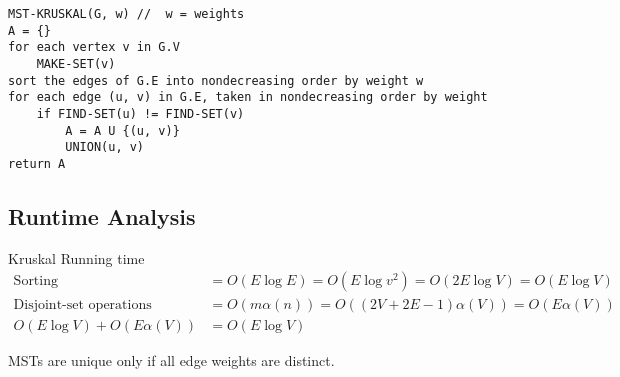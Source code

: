\documentclass{article}
\begin{document}
\begin{verbatim}
MST-KRUSKAL(G, w) //  w = weights
A = {}
for each vertex v in G.V
    MAKE-SET(v)
sort the edges of G.E into nondecreasing order by weight w
for each edge (u, v) in G.E, taken in nondecreasing order by weight
    if FIND-SET(u) != FIND-SET(v)
        A = A U {(u, v)}
        UNION(u, v)
return A
\end{verbatim}

\subsection*{Runtime Analysis}
Kruskal Running time
\begin{align*}
    \text{Sorting }                & = O(E \log E) = O(E \log v^2) = O(2E \log V) = O(E \log V)     \\
    \text{Disjoint-set operations} & = O(m \alpha(n)) = O((2V + 2E - 1) \alpha(V)) = O(E \alpha(V)) \\
    O(E \log V) + O(E \alpha(V))   & = O(E \log V)
\end{align*}

MSTs are unique only if all edge weights are distinct.
\end{document}
